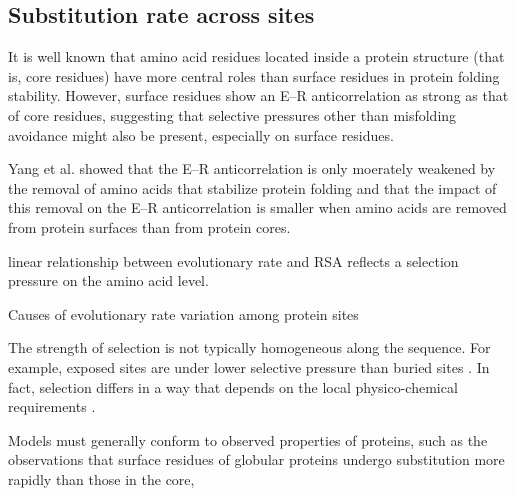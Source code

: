 \subsection{Substitution rate across sites}
It is well known that amino acid residues located inside a protein structure (that is, core residues) have more central roles than surface residues in protein folding stability.
However, surface residues show an E–R anticorrelation as strong as that of core residues, suggesting that selective pressures other than misfolding avoidance might also be present, especially on surface residues.

Yang et al. showed that the E–R anticorrelation is only moerately weakened by the removal of amino acids that stabilize protein folding and that the impact of this removal on the E–R anticorrelation is smaller when amino acids are removed from protein surfaces than from protein cores. 

linear relationship between evolutionary rate and RSA reflects a selection pressure on the amino acid level. \citep{Ramsey2011}

Causes of evolutionary rate variation among protein sites \citep{Echave2016}

The strength of selection is not typically homogeneous along the sequence.
For example, exposed sites are under lower selective pressure than buried sites \citep{Echave2016}.
In fact, selection differs in a way that depends on the local physico-chemical requirements \citep{Goldstein2016,Goldstein2017,Weber2019}.

Models must generally conform to observed properties of proteins, such as the observations that surface residues of globular proteins undergo \gls{substitution} more rapidly than those in the core,

